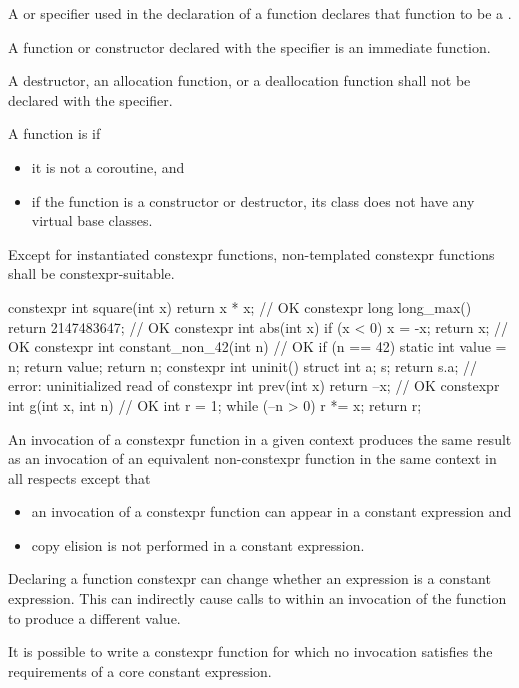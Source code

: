 \pnum
A  or  specifier
used in the declaration of a function
declares that function to be
a .
\begin{note}
A function or constructor declared with the  specifier
is an immediate function.
\end{note}
A destructor, an allocation function, or a deallocation function
shall not be declared with the  specifier.

\pnum
{}%
%
A function is  if
\begin{itemize}
\item
it is not a coroutine, and

\item
if the function is a constructor or destructor,
its class does not have any virtual base classes.
\end{itemize}
Except for instantiated constexpr functions,
non-templated constexpr functions shall be constexpr-suitable.

\begin{example}
\begin{codeblock}
constexpr int square(int x)
  { return x * x; }             // OK
constexpr long long_max()
  { return 2147483647; }        // OK
constexpr int abs(int x) {
  if (x < 0)
    x = -x;
  return x;                     // OK
}
constexpr int constant_non_42(int n) {  // OK
  if (n == 42) {
    static int value = n;
    return value;
  }
  return n;
}
constexpr int uninit() {
  struct { int a; } s;
  return s.a;                   // error: uninitialized read of 
}
constexpr int prev(int x)
  { return --x; }               // OK
constexpr int g(int x, int n) { // OK
  int r = 1;
  while (--n > 0) r *= x;
  return r;
}
\end{codeblock}
\end{example}

\pnum
An invocation of a constexpr function in a given context
produces the same result as
an invocation of an equivalent non-constexpr function in the same context
in all respects except that
\begin{itemize}
\item
an invocation of a constexpr function
can appear in a constant expression and
\item
copy elision is not performed in a constant expression.
\end{itemize}
\begin{note}
Declaring a function constexpr can change whether an expression
is a constant expression.
This can indirectly cause calls to 
within an invocation of the function to produce a different value.
\end{note}
\begin{note}
It is possible to write a constexpr function for which
no invocation satisfies the requirements of a core constant expression.
\end{note}

